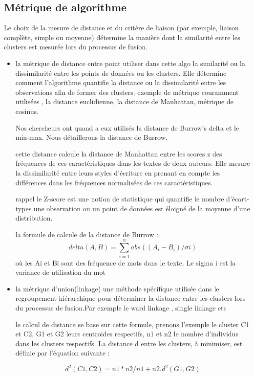 \documentclass[]{report}
\begin{document}
\subsection{Métrique de algorithme }
Le choix de la mesure de distance et du critère de liaison (par exemple, liaison complète, simple ou moyenne) détermine la manière dont la similarité entre les clusters est mesurée lors du processus de fusion.
\begin{itemize}
	\item la métrique  de distance entre point utiliser dans cette algo la similarité ou la dissimilarité entre les points de données ou les clusters. Elle détermine comment l'algorithme quantifie la distance ou la dissimilarité entre les observations afin de former des clusters. 
	exemple de métrique couramment utilisées , la distance euclidienne, la distance de Manhattan, métrique de cosinus.
	
	Nos chercheurs ont quand a eux utilisés la distance de Burrow's delta et le min-max. Nous détaillerons la distance de Burrow.
	
	  cette distance calcule la distance de Manhattan entre les scores z des fréquences de ces caractéristiques dans les textes de deux auteurs. Elle mesure la dissimilarité entre leurs styles d'écriture en prenant en compte les différences dans les fréquences normalisées de ces caractéristiques.
	  
	  rappel le Z-score est une notion de statistique qui quantifie le nombre d'écart-types une observation ou un point de données est éloigné de la moyenne d'une distribution.
	  
	  la formule de calcule de la distance de Burrow :
	  \[ delta(A,B)= \sum_{i=1}^n abs((A_i - B_i)/ \sigma i ) \]
	  où les Ai et Bi sont des fréquence de mots dans le texte.
	  Le sigma i est la variance de utilisation du mot
	  
	\item la métrique d'union(linkage) une méthode spécifique utilisée dans le regroupement hiérarchique pour déterminer la distance entre les clusters lors du processus de fusion.Par exemple le ward linkage , single linkage etc 
	
	le calcul de distance se base sur cette formule,  prenons l'exemple le cluster C1 et C2,  G1 et G2 leurs centroides respectifs,  n1 et n2 le nombre d'individus dans les clusters respectifs. 
	La distance d entre les clusters, à minimiser, est définie par l'équation suivante :
	
	\[d^2( C1,C2) = n1 * n2 / n1 + n2 . d^2(G1,G2)\]
	 
\end{itemize}
\end{document}
